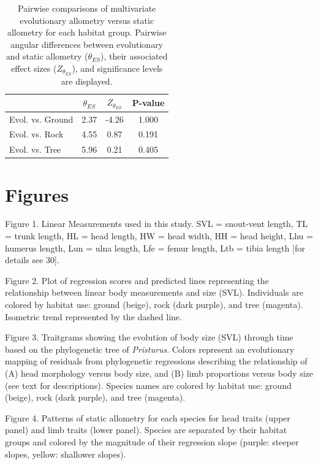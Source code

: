 \documentclass[
  11pt,
]{article}
\begin{document}
\begin{table}[H]

\caption{\label{tab:unnamed-chunk-3}Pairwise comparisons of multivariate evolutionary allometry versus static allometry for each habitat group. Pairwise angular differences between evolutionary and static allometry ($\theta_{ES}$), their associated effect sizes ($Z_{\theta_{ES}}$), and significance levels are displayed.}
\centering
\begin{tabular}[t]{lccc}
\toprule
  & $\theta_{ES}$ & $Z_{\theta_{ES}}$ & P-value\\
\midrule
Evol. vs. Ground & 2.37 & -4.26 & 1.000\\
Evol. vs. Rock & 4.55 & 0.87 & 0.191\\
Evol. vs. Tree & 5.96 & 0.21 & 0.405\\
\bottomrule
\end{tabular}
\end{table}

\newpage

\hypertarget{figures}{%
\section{Figures}\label{figures}}

Figure 1. Linear Measurements used in this study. SVL = snout-vent
length, TL = trunk length, HL = head length, HW = head width, HH = head
height, Lhu = humerus length, Lun = ulna length, Lfe = femur length, Ltb
= tibia length {[}for details see 30{]}.

Figure 2. Plot of regression scores and predicted lines representing the
relationship between linear body measurements and size (SVL).
Individuals are colored by habitat use: ground (beige), rock (dark
purple), and tree (magenta). Isometric trend represented by the dashed
line.

Figure 3. Traitgrams showing the evolution of body size (SVL) through
time based on the phylogenetic tree of \emph{Pristurus}. Colors
represent an evolutionary mapping of residuals from phylogenetic
regressions describing the relationship of (A) head morphology versus
body size, and (B) limb proportions versus body size (see text for
descriptions). Species names are colored by habitat use: ground (beige),
rock (dark purple), and tree (magenta).

Figure 4. Patterns of static allometry for each species for head traits
(upper panel) and limb traits (lower panel). Species are separated by
their habitat groups and colored by the magnitude of their regression
slope (purple: steeper slopes, yellow: shallower slopes).
\end{document}
